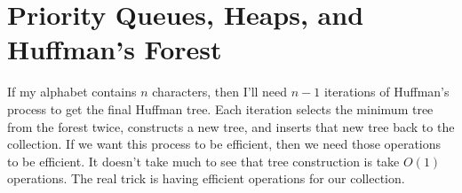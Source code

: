 \documentclass[]{tufte-handout}
\begin{document}
\section{Priority Queues, Heaps, and Huffman's Forest}

If my alphabet contains $n$ characters, then I'll need $n-1$ iterations of Huffman's process to get the final Huffman tree. Each iteration selects the minimum tree from the forest twice, constructs a new tree, and inserts that new tree back to the collection. If we want this process to be efficient, then we need those operations to be efficient. It doesn't take much to see that tree construction is take $O(1)$ operations. The real trick is having efficient operations for our collection. 









\end{document}
